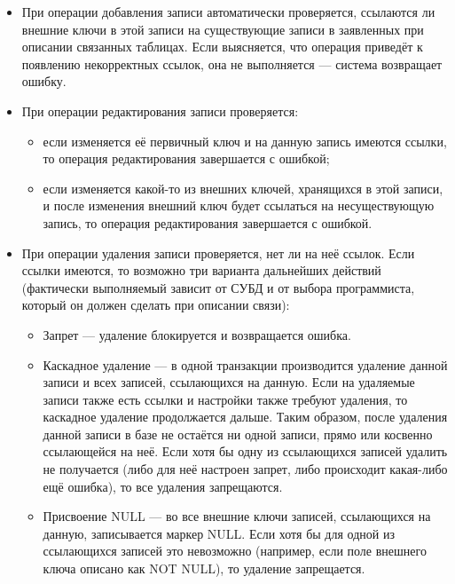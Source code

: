 \begin{itemize}
    \item При операции добавления записи автоматически проверяется, ссылаются ли внешние ключи в этой записи на существующие записи в заявленных при описании связанных таблицах. Если выясняется, что операция приведёт к появлению некорректных ссылок, она не выполняется — система возвращает ошибку.
    
    \item При операции редактирования записи проверяется:
    \begin{itemize}
        \item если изменяется её первичный ключ и на данную запись имеются ссылки, то операция редактирования завершается с ошибкой;
        \item если изменяется какой-то из внешних ключей, хранящихся в этой записи, и после изменения внешний ключ будет ссылаться на несуществующую запись, то операция редактирования завершается с ошибкой.
    \end{itemize}
    
    \item При операции удаления записи проверяется, нет ли на неё ссылок. Если ссылки имеются, то возможно три варианта дальнейших действий (фактически выполняемый зависит от СУБД и от выбора программиста, который он должен сделать при описании связи):
    \begin{itemize}
        \item Запрет — удаление блокируется и возвращается ошибка.
        \item Каскадное удаление — в одной транзакции производится удаление данной записи и всех записей, ссылающихся на данную. Если на удаляемые записи также есть ссылки и настройки также требуют удаления, то каскадное удаление продолжается дальше. Таким образом, после удаления данной записи в базе не остаётся ни одной записи, прямо или косвенно ссылающейся на неё. Если хотя бы одну из ссылающихся записей удалить не получается (либо для неё настроен запрет, либо происходит какая-либо ещё ошибка), то все удаления запрещаются.
        \item Присвоение NULL — во все внешние ключи записей, ссылающихся на данную, записывается маркер NULL. Если хотя бы для одной из ссылающихся записей это невозможно (например, если поле внешнего ключа описано как NOT NULL), то удаление запрещается.
    \end{itemize}
\end{itemize}

